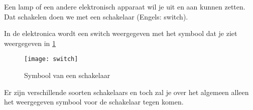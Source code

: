 Een lamp of een andere elektronisch apparaat wil je uit en aan kunnen zetten. Dat schakelen doen we met een schakelaar (Engels: switch).

In de elektronica wordt een switch weergegeven met het symbool dat je ziet weergegeven in \ref{symbool:switch}

\begin{figure}[h]
\texttt{[image: switch]}
\centering
\caption{Symbool van een schakelaar}
\label{symbool:switch}
\end{figure}

Er zijn verschillende soorten schakelaars en toch zal je over het algemeen alleen het weergegeven symbool voor de schakelaar tegen komen.
